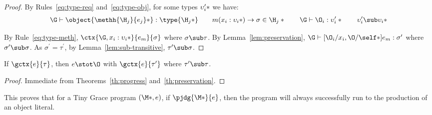 \begin{theorem}[Preservation]
\begin{proof}
    \noindent By Rules~\ref{eq:type-req} and~\ref{eq:type-obj}, for some types
    $\*\upsilon^\prime_i*$ we have:
%
    \begin{displaymath}
      \G \vdash \object{\*\methh{\H_j}{e_j}*} : \type{\*\H_j*} \quad\quad
      m(\*x_i : \upsilon_i*) \to \sigma \in \*\H_j* \quad\quad
      \G \vdash \*\O_i : \upsilon^\prime_i* \quad\quad
      \*\upsilon^\prime_i \sub \upsilon_i*
    \end{displaymath}

    \noindent By Rule~\ref{eq:type-meth}, $\ctx{\G,\*x_i :
    \upsilon_i*}{e_m}{\sigma}$ where $\sigma \sub \tau$. By
    Lemma~\ref{lem:preservation}, $\G \vdash [\*\O_i/x_i,\O/\self*]e_m :
    \sigma^\prime$ where $\sigma^\prime \sub \sigma$.  As $\sigma^\prime =
    \tau^\prime$, by Lemma~\ref{lem:sub-transitive}, $\tau^\prime \sub \sigma$.
  \end{proof}

\end{theorem}

\begin{theorem}\label{th:type-soundness}
  If $\gctx{e}{\tau}$, then $e \stot \O$ with $\gctx{e}{\tau^\prime}$ where
  $\tau^\prime \sub \tau$.

  \begin{proof}
    Immediate from Theorems~\ref{th:progress} and~\ref{th:preservation}.
  \end{proof}
\end{theorem}

\noindent This proves that for a Tiny Grace program $(\*\M*, e)$, if
$\pjdg{\*\M*}{e}$, then the program will always successfully run to the
production of an object literal.


